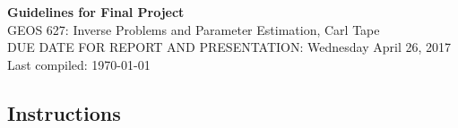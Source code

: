 \documentclass[11pt,titlepage,fleqn]{article}
\begin{document}

\begin{center}
{\large \bf Guidelines for Final Project} \\
GEOS 627: Inverse Problems and Parameter Estimation, Carl Tape \\
DUE DATE FOR REPORT AND PRESENTATION: Wednesday April 26, 2017 \\
Last compiled: \today
\end{center}


\subsection*{Instructions}
\end{document}
